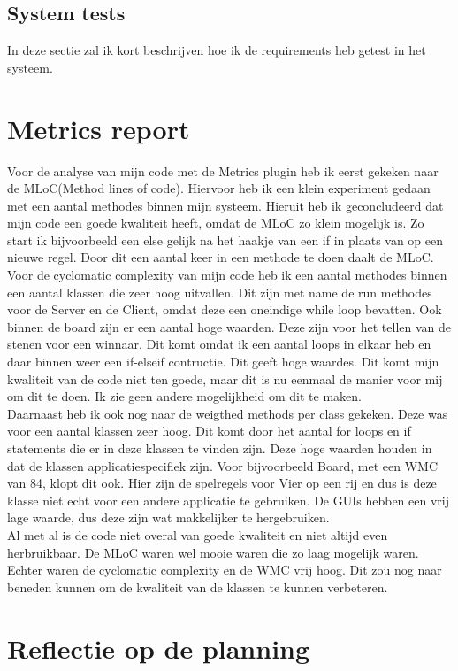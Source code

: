 \documentclass[12pt]{article}
\begin{document}
\subsection{System tests}
In deze sectie zal ik kort beschrijven hoe ik de requirements heb getest in het systeem.

\section{Metrics report}
Voor de analyse van mijn code met de Metrics plugin heb ik eerst gekeken naar de MLoC(Method lines of code). Hiervoor heb ik een klein experiment gedaan met een aantal methodes binnen mijn systeem. Hieruit heb ik geconcludeerd dat mijn code een goede kwaliteit heeft, omdat de MLoC zo klein mogelijk is. Zo start ik bijvoorbeeld een else gelijk na het haakje van een if in plaats van op een nieuwe regel. Door dit een aantal keer in een methode te doen daalt de MLoC.\\
Voor de cyclomatic complexity van mijn code heb ik een aantal methodes binnen een aantal klassen die zeer hoog uitvallen. Dit zijn met name de run methodes voor de Server en de Client, omdat deze een oneindige while loop bevatten. Ook binnen de board zijn er een aantal hoge waarden. Deze zijn voor het tellen van de stenen voor een winnaar. Dit komt omdat ik een aantal loops in elkaar heb en daar binnen weer een if-elseif contructie. Dit geeft hoge waardes. Dit komt mijn kwaliteit van de code niet ten goede, maar dit is nu eenmaal de manier voor mij om dit te doen. Ik zie geen andere mogelijkheid om dit te maken.\\
Daarnaast heb ik ook nog naar de weigthed methods per class gekeken. Deze was voor een aantal klassen zeer hoog. Dit komt door het aantal for loops en if statements die er in deze klassen te vinden zijn. Deze hoge waarden houden in dat de klassen applicatiespecifiek zijn. Voor bijvoorbeeld Board, met een WMC van 84, klopt dit ook. Hier zijn de spelregels voor Vier op een rij en dus is deze klasse niet echt voor een andere applicatie te gebruiken. De GUIs hebben een vrij lage waarde, dus deze zijn wat makkelijker te hergebruiken.\\
Al met al is de code niet overal van goede kwaliteit en niet altijd even herbruikbaar. De MLoC waren wel mooie waren die zo laag mogelijk waren. Echter waren de cyclomatic complexity en de WMC vrij hoog. Dit zou nog naar beneden kunnen om de kwaliteit van de klassen te kunnen verbeteren.

\section{Reflectie op de planning}
\end{document}
